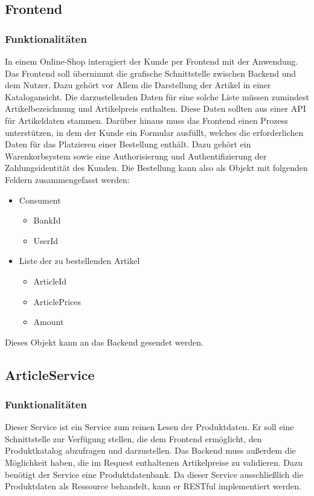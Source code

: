 \subsection{Frontend}
\subsubsection{Funktionalitäten}
In einem Online-Shop interagiert der Kunde per Frontend mit der Anwendung. Das Frontend soll übernimmt die grafische Schnittstelle zwischen Backend und dem Nutzer. Dazu gehört vor Allem die Darstellung der Artikel in einer Katalogansicht. Die darzustellenden Daten für eine solche Liste müssen zumindest Artikelbezeichnung und Artikelpreis enthalten. Diese Daten sollten aus einer API für Artikeldaten stammen. Darüber hinaus muss das Frontend einen Prozess unterstützen, in dem der Kunde ein Formular ausfüllt, welches die erforderlichen Daten für das Platzieren einer Bestellung enthält. Dazu gehört ein Warenkorbsystem sowie eine Authorisierung und Authentifizierung der Zahlungsidentität des Kunden. Die Bestellung kann also als Objekt mit folgenden Feldern zusammengefasst werden:
\begin{itemize}
	\item Consument
	\begin{itemize}
		\item BankId
		\item UserId
	\end{itemize}
	\item Liste der zu bestellenden Artikel
	\begin{itemize}
		\item ArticleId
		\item ArticlePrices
		\item Amount
	\end{itemize}
\end{itemize}

Dieses Objekt kann an das Backend gesendet werden.

\subsection{ArticleService}
\subsubsection{Funktionalitäten}
Dieser Service ist ein Service zum reinen Lesen der Produktdaten. Er soll eine Schnittstelle zur Verfügung stellen, die dem Frontend ermöglicht, den Produktkatalog abzufragen und darzustellen. Das Backend muss außerdem die Möglichkeit haben, die im Request enthaltenen Artikelpreise zu validieren. Dazu benötigt der Service eine Produktdatenbank. Da dieser Service ausschließlich die Produktdaten als Ressource behandelt, kann er RESTful implementiert werden.

